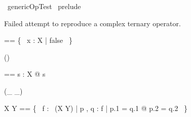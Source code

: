 \begin{zsection}
  \SECTION\ genericOpTest \parents\ prelude
\end{zsection}

Failed attempt to reproduce a complex ternary operator.

\begin{zed}
\emptyset [ X ] == \{~ x : X | false ~\}
\end{zed}

\begin{zed}
\function (\langle \listarg \rangle)
\end{zed}

\begin{zed}
\langle \listarg \rangle [ X ]  == \lambda s : X @ s
\end{zed}

\begin{zed}
 \rightassoc (\_ \bla \_)
\end{zed}

\begin{zed}
X \bla Y == \{~ f : \power~(X \cross Y) | \forall p , q : f | p.1 = q.1 @ p.2 = q.2 ~\}
\end{zed}
